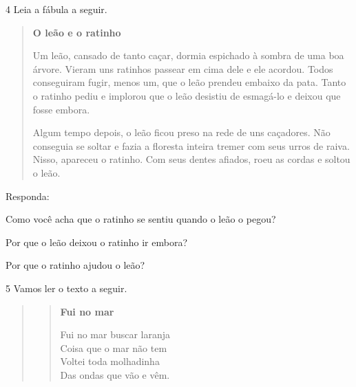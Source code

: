 \pagebreak
\num{4} Leia a fábula a seguir.


\begin{quote}
\textbf{O leão e o ratinho}

Um leão, cansado de tanto caçar, dormia espichado à sombra de uma boa
árvore. Vieram uns ratinhos passear em cima dele e ele acordou. Todos
conseguiram fugir, menos um, que o leão prendeu embaixo da pata. Tanto o
ratinho pediu e implorou que o leão desistiu de esmagá-lo e deixou que
fosse embora.

Algum tempo depois, o leão ficou preso na rede de uns caçadores. Não
conseguia se soltar e fazia a floresta inteira tremer com seus urros de
raiva. Nisso, apareceu o ratinho. Com seus dentes afiados, roeu as
cordas e soltou o leão.

\end{quote}

Responda:

\begin{escolha}
\item Como você acha que o ratinho se sentiu quando o leão o pegou?


\item Por que o leão deixou o ratinho ir embora?


\item Por que o ratinho ajudou o leão?

\end{escolha}

\pagebreak
\num{5} Vamos ler o texto a seguir.

\begin{quote}
\begin{verse}
\textbf{Fui no mar}

Fui no mar buscar laranja\\
Coisa que o mar não tem\\
Voltei toda molhadinha\\
Das ondas que vão e vêm.
\end{verse}

\end{quote}

